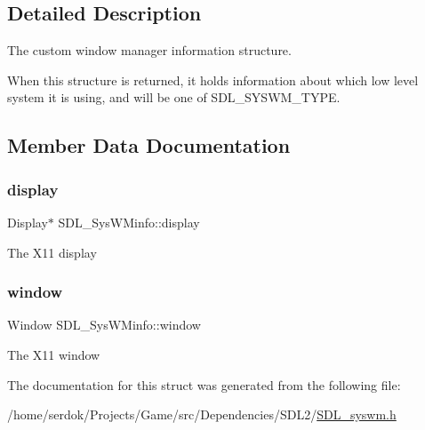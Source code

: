 \subsection{Detailed Description}
The custom window manager information structure.

When this structure is returned, it holds information about which low level system it is using, and will be one of S\+D\+L\+\_\+\+S\+Y\+S\+W\+M\+\_\+\+T\+Y\+PE. 

\subsection{Member Data Documentation}
\mbox{\label{structSDL__SysWMinfo_a58ef8bc8e1065e95e75a08d08f4a4741}} 
\subsubsection{\texorpdfstring{display}{display}}
{\footnotesize\ttfamily Display$\ast$ S\+D\+L\+\_\+\+Sys\+W\+Minfo\+::display}

The X11 display \mbox{\label{structSDL__SysWMinfo_a83ca4b0f4bdf67a0edee03d5bde86b93}} 
\subsubsection{\texorpdfstring{window}{window}}
{\footnotesize\ttfamily Window S\+D\+L\+\_\+\+Sys\+W\+Minfo\+::window}

The X11 window 

The documentation for this struct was generated from the following file\+:\begin{DoxyCompactItemize}
\item 
/home/serdok/\+Projects/\+Game/src/\+Dependencies/\+S\+D\+L2/\hyperlink{SDL__syswm_8h}{S\+D\+L\+\_\+syswm.\+h}\end{DoxyCompactItemize}
